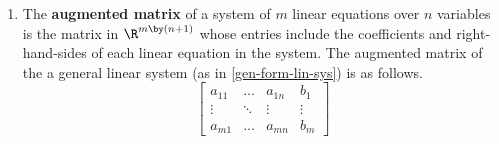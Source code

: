 \begin{enumerate}
  \textit{Examples.}
  \begin{itemize}
  \item The following is a matrix in $\R^{3 \by 2}$.
    \begin{displaymath}
      \begin{bmatrix}
        1 & 2 \\
        \pi & -4 \\
        -22.4 & 0
      \end{bmatrix}
    \end{displaymath}
  \item The following is a matrix in $\R^{1 \by 5}$.
    \begin{displaymath}
      \begin{bmatrix}
        1 & 2 & 3 & 4 & 5
      \end{bmatrix}
    \end{displaymath}
  \end{itemize}
\item The \textbf{augmented matrix} of a system of $m$ linear
  equations over $n$ variables is the matrix in $\R^{m \by (n + 1)}$
  whose entries include the coefficients and right-hand-sides of each
  linear equation in the system.  The augmented matrix of the a
  general linear system (as in \ref{gen-form-lin-sys}) is as follows.
  \begin{displaymath}
    \begin{bmatrix}
      a_{11} & \dots & a_{1n} & b_1 \\
      \vdots & \ddots & \vdots & \vdots \\
      a_{m1} & \dots & a_{mn} & b_m
    \end{bmatrix}
  \end{displaymath}


\end{enumerate}
